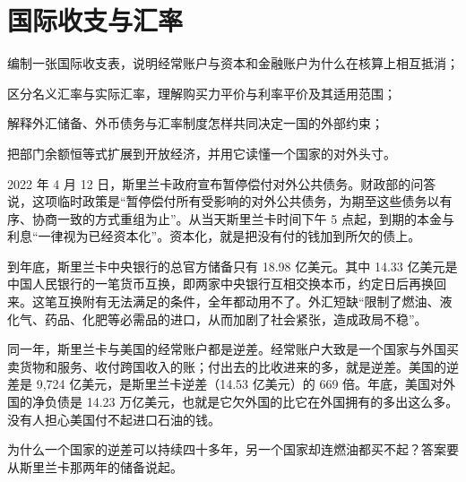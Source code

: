\chapter{国际收支与汇率}\label{ch:external}

\begin{chapterguide}
\begin{guidegoals}
\item 编制一张国际收支表，说明经常账户与资本和金融账户为什么在核算上相互抵消；
\item 区分名义汇率与实际汇率，理解购买力平价与利率平价及其适用范围；
\item 解释外汇储备、外币债务与汇率制度怎样共同决定一国的外部约束；
\item 把部门余额恒等式扩展到开放经济，并用它读懂一个国家的对外头寸。
\end{guidegoals}
\end{chapterguide}

2022 年 4 月 12 日，斯里兰卡政府宣布暂停偿付对外公共债务。财政部的问答说，这项临时政策是“暂停偿付所有受影响的对外公共债务，为期至这些债务以有序、协商一致的方式重组为止”。从当天斯里兰卡时间下午 5 点起，到期的本金与利息“一律视为已经资本化”\cite{lktreasury2022}。资本化，就是把没有付的钱加到所欠的债上。

到年底，斯里兰卡中央银行的总官方储备只有 18.98 亿美元。其中 14.33 亿美元是中国人民银行的一笔货币互换，即两家中央银行互相交换本币，约定日后再换回来。这笔互换附有无法满足的条件，全年都动用不了。外汇短缺“限制了燃油、液化气、药品、化肥等必需品的进口，从而加剧了社会紧张，造成政局不稳”\cite{cbsl2023ar}。

同一年，斯里兰卡与美国的经常账户都是逆差。经常账户大致是一个国家与外国买卖货物和服务、收付跨国收入的账；付出去的比收进来的多，就是逆差。美国的逆差是 9,724 亿美元，是斯里兰卡逆差（14.53 亿美元）的 669 倍\cite{wdi2026}。年底，美国对外国的净负债是 14.23 万亿美元，也就是它欠外国的比它在外国拥有的多出这么多\cite{fred2026x}。没有人担心美国付不起进口石油的钱。

为什么一个国家的逆差可以持续四十多年，另一个国家却连燃油都买不起？答案要从斯里兰卡那两年的储备说起。

